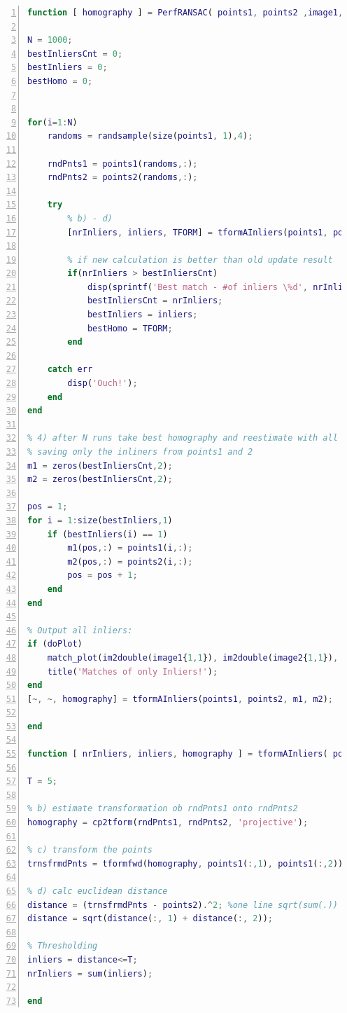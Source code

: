 \documentclass[subfigure,epsfig,fleqn,float,numbers=noenddot]{scrartcl}
\begin{document}
\begin{lstlisting}[language=Matlab, numbers=left, numberstyle=\tiny]
function [ homography ] = PerfRANSAC( points1, points2 ,image1, image2, doPlot)

N = 1000;
bestInliersCnt = 0;
bestInliers = 0; 
bestHomo = 0;


for(i=1:N)
    randoms = randsample(size(points1, 1),4);
    
    rndPnts1 = points1(randoms,:);
    rndPnts2 = points2(randoms,:);
        
    try
        % b) - d)
        [nrInliers, inliers, TFORM] = tformAInliers(points1, points2, rndPnts1, rndPnts2);
        
        % if new calculation is better than old update result
        if(nrInliers > bestInliersCnt)
            disp(sprintf('Best match - #of inliers \%d', nrInliers));
            bestInliersCnt = nrInliers;
            bestInliers = inliers; 
            bestHomo = TFORM;
        end
        
    catch err
        disp('Ouch!');
    end
end

% 4) after N runs take best homography and reestimate with all points
% saving only the inliners from points1 and 2
m1 = zeros(bestInliersCnt,2);
m2 = zeros(bestInliersCnt,2);

pos = 1;
for i = 1:size(bestInliers,1)
    if (bestInliers(i) == 1)
        m1(pos,:) = points1(i,:);
        m2(pos,:) = points2(i,:);
        pos = pos + 1;
    end
end

% Output all inliers:
if (doPlot)
    match_plot(im2double(image1{1,1}), im2double(image2{1,1}), m1, m2);
    title('Matches of only Inliers!');
end
[~, ~, homography] = tformAInliers(points1, points2, m1, m2);

end

function [ nrInliers, inliers, homography ] = tformAInliers( points1, points2, rndPnts1, rndPnts2)

T = 5;

% b) estimate transformation ob rndPnts1 onto rndPnts2
homography = cp2tform(rndPnts1, rndPnts2, 'projective');

% c) transform the points 
trnsfrmdPnts = tformfwd(homography, points1(:,1), points1(:,2));

% d) calc euclidean distance
distance = (trnsfrmdPnts - points2).^2; %one line sqrt(sum(.))
distance = sqrt(distance(:, 1) + distance(:, 2));

% Thresholding
inliers = distance<=T;
nrInliers = sum(inliers);

end
\end{lstlisting}
\end{document}
